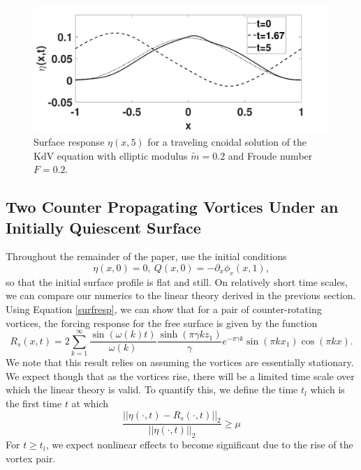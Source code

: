 \documentclass[a4paper,11pt]{article}
\newcommand{\p}{\partial}
\newcommand{\gnorm}[1]{\left|\left| #1\right|\right|}
\begin{document}
\begin{figure}[h!]
\centering
\includegraphics[width=.6\textwidth]{surf_resp_cnoid_mu_pt2_F_pt2_tf_5NEW}
\caption{\small Surface response $\eta(x,5)$ for a traveling cnoidal solution of the KdV equation with elliptic modulus $\tilde{m}=0.2$ and Froude number $F=0.2$.}
\label{fig:surfrepcnstr}
\end{figure}

\newpage
\subsection{Two Counter Propagating Vortices Under an Initially Quiescent Surface}
Throughout the remainder of the paper, use the initial conditions
\[
\eta(x,0) = 0, ~ Q(x,0) = -\p_{x}\phi_{v}(x,1),
\]
so that the initial surface profile is flat and still.  On relatively short time scales, we can compare our numerics to the linear theory derived in the previous section.  Using Equation \eqref{surfresp}, we can show that for a pair of counter-rotating vortices, the forcing response for the free surface is given by the function
\begin{equation}
R_{s}(x,t) = 2\sum_{k=1}^{\infty} \frac{\sin(\omega(k)t)}{\omega(k)}\frac{\sinh(\pi \gamma k z_{1})}{\gamma}e^{-\pi \gamma k}\sin(\pi k x_{1})\cos(\pi k x).
\label{twovortsurfresp}
\end{equation}
We note that this result relies on assuming the vortices are essentially stationary.  We expect though that as the vortices rise, there will be a limited time scale over which the linear theory is valid.  To quantify this, we define the time $t_{l}$ which is the first time $t$ at which 
\[
\frac{\gnorm{\eta(\cdot,t)-R_{s}(\cdot,t)}_{2}}{\gnorm{\eta(\cdot,t)}_{2}}\geq \mu
\]    
For $t\geq t_{l}$, we expect nonlinear effects to become significant due to the rise of the vortex pair.    
\end{document}
